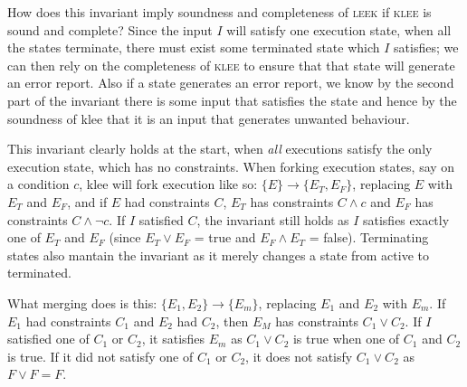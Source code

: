 \documentclass[12pt,a4paper]{article}
\newcommand{\klee}{\textsc{klee }}
\newcommand{\leek}{\textsc{leek }}
\begin{document}
How does this invariant imply soundness and completeness of \leek if \klee is sound and complete? Since the input $I$ will satisfy one execution state, when all the states terminate, there must exist some terminated state which $I$ satisfies; we can then rely on the completeness of \klee to ensure that that state will generate an error report. Also if a state generates an error report, we know by the second part of the invariant there is some input that satisfies the state and hence by the soundness of klee that it is an input that generates unwanted behaviour.

This invariant clearly holds at the start, when \emph{all} executions satisfy the only execution state, which has no constraints. When forking execution states, say on a condition $c$, klee will fork execution like so: $\{E\} \rightarrow \{E_T, E_F\}$, replacing $E$ with $E_T$ and $E_F$, and if $E$ had constraints $C$, $E_T$ has constraints $C \wedge c$ and $E_F$ has constraints $C \wedge \neg c$. If $I$ satisfied $C$, the invariant still holds as $I$ satisfies exactly one of $E_T$ and $E_F$ (since $E_T \vee E_F$ = true and $E_F \wedge E_T$ = false). Terminating states also mantain the invariant as it merely changes a state from active to terminated.

What merging does is this: $\{E_1, E_2\} \rightarrow \{E_m\}$, replacing $E_1$ and $E_2$ with $E_m$. If $E_1$ had constraints $C_1$ and $E_2$ had $C_2$, then $E_M$ has constraints $C_1 \vee C_2$. If $I$ satisfied one of $C_1$ or $C_2$, it satisfies $E_m$ as $C_1 \vee C_2$ is true when one of $C_1$ and $C_2$ is true. If it did not satisfy one of $C_1$ or $C_2$, it does not satisfy $C_1 \vee C_2$ as $F \vee F = F$.
\end{document}
